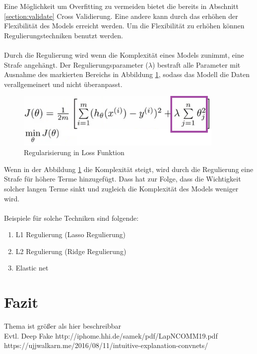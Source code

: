 \documentclass[12pt,oneside,a4paper,parskip]{scrbook}
\begin{document}
Eine Möglichkeit um Overfitting zu vermeiden bietet die bereits in Abschnitt \ref{section:validate} Cross Validierung. Eine andere kann durch das erhöhen der Flexibilität des Models erreicht werden. Um die Flexibilität zu erhöhen können Regulierungstechniken benutzt werden.
\\\\
Durch die Regulierung wird wenn die Komplexität eines Models zunimmt, eine Strafe angehängt. Der Regulierungsparameter (${\lambda}$) bestraft alle Parameter mit Ausnahme des markierten Bereichs in Abbildung \ref{fig:regFunc}, sodass das Modell die Daten verallgemeinert und nicht überanpasst.

\begin{figure}[h]
	\begin{center}
		\includegraphics[width=10cm]{Bilder/regFunc.png}
		\caption{Regularisierung in Loss Funktion}
		\label{fig:regFunc}
	\end{center}
\end{figure}

Wenn in der Abbildung \ref{fig:regFunc} die Komplexität steigt, wird durch die Regulierung eine Strafe für höhere Terme hinzugefügt. Dass hat zur Folge, dass die Wichtigkeit solcher langen Terme sinkt und zugleich die Komplexität des Models weniger wird.
\\\\
Beispiele für solche Techniken sind folgende:

\begin{enumerate}
	\item L1 Regulierung (Lasso Regulierung)
	\item L2 Regulierung (Ridge Regulierung)
	\item Elastic net
\end{enumerate}


\chapter{Fazit}
Thema ist größer als hier beschreibbar
\\Evtl. Deep Fake
http://iphome.hhi.de/samek/pdf/LapNCOMM19.pdf
https://ujjwalkarn.me/2016/08/11/intuitive-explanation-convnets/



\backmatter


\cleardoublepage
{}
{}
\printbibliography
\end{document}

